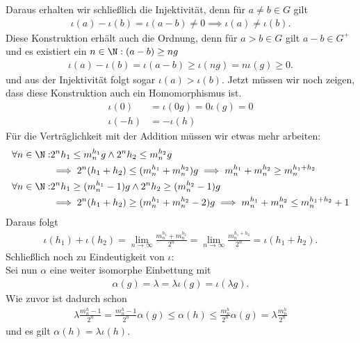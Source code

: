 \begin{solution}
Daraus erhalten wir schließlich die Injektivität, denn für $a \neq b \in G$ gilt
\begin{align*}
  \iota(a) - \iota(b) = \iota(a-b) \neq 0 \implies \iota(a) \neq \iota(b).
\end{align*}
Diese Konstruktion erhält auch die Ordnung, denn für $a > b \in G$ gilt $a-b \in G^+$
und es existiert ein $n \in \N: (a-b) \geq ng$
\begin{align*}
  \iota(a) - \iota(b) = \iota(a-b) \geq \iota(ng) = n\iota(g) \geq 0.
\end{align*}
und aus der Injektivität folgt sogar $\iota(a) > \iota(b)$.
Jetzt müssen wir noch zeigen, dass diese Konstruktion auch ein Homomorphismus ist.
\begin{align*}
  \iota(0) &= \iota(0g) = 0\iota(g) = 0 \\
  \iota(-h) &= -\iota(h)
\end{align*}
Für die Verträglichkeit mit der Addition müssen wir etwas mehr arbeiten:
\begin{align*}
  \forall n \in \N:& 2^nh_1 \leq m_n^{h_1}g \land 2^nh_2 \leq m_n^{h_2}g \\
  &\implies 2^n(h_1 + h_2) \leq (m_n^{h_1} + m_n^{h_2})g \implies m_n^{h_1} + m_n^{h_2} \geq m_n^{h_1 + h_2} \\
  \forall n \in \N:& 2^nh_1 \geq (m_n^{h_1}-1)g \land 2^nh_2 \geq (m_n^{h_2}-1)g \\
  &\implies 2^n(h_1 + h_2) \geq (m_n^{h_1} + m_n^{h_2} - 2)g \implies m_n^{h_1} + m_n^{h_2} \leq m_n^{h_1 + h_2} + 1
\end{align*}
Daraus folgt
\begin{align*}
  \iota(h_1) + \iota(h_2) = \lim_{n \rightarrow \infty} \frac{m_n^{h_1} + m_n^{h_2}}{2^n}
  = \lim_{n \rightarrow \infty} \frac{m_n^{h_1 + h_2}}{2^n} = \iota(h_1 + h_2).
\end{align*}
Schließlich noch zu Eindeutigkeit von $\iota$: \\
Sei nun $\alpha$ eine weiter isomorphe Einbettung mit
\begin{align*}
  \alpha(g) = \lambda = \lambda \iota(g) = \iota(\lambda g).
\end{align*}
Wie zuvor ist dadurch schon
\begin{align*}
  \lambda \frac{m_n^h - 1}{2^n} = \frac{m_n^h - 1}{2^n}\alpha(g) \leq \alpha(h) \leq \frac{m_n^h}{2^n}\alpha(g)
  = \lambda \frac{m_n^h}{2^n}
\end{align*}
und es gilt $\alpha(h) = \lambda \iota(h)$.
\end{solution}
